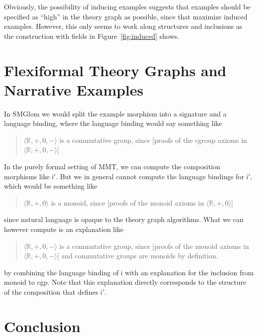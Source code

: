 \documentclass[11pt]{bluenote}
\begin{document}
Obviously, the possibility of inducing examples suggests that examples should be specified
as ``high'' in the theory graph as possible, since that maximize induced
examples. However, this only seems to work along structures and inclusions as the
construction with fields in Figure~\ref{fig:induced} shows.

\section{Flexiformal Theory Graphs and Narrative Examples}

In SMGlom we would split the example morphism into a signature and a language binding,
where the language binding would say something like 
\begin{quote}
  $\langle\mathbb{R},+,0,-\rangle$ is a commutative group, since [proofs of the cgroup
  axioms in $\langle\mathbb{R},+,0,-\rangle$]
\end{quote}
In the purely formal setting of MMT, we can compute the composition morphisms like
$\mathsf{i}'$. But we in general cannot compute the language bindings for $\mathsf{i}'$,
which would be something like 
\begin{quote}
  $\langle\mathbb{R},+,0\rangle$ is a monoid, since [proofs of the monoid axioms in $\langle\mathbb{R},+,0\rangle$]
\end{quote}
since natural language is opaque to the theory graph algorithms. What we can however
compute is an explanation like 
\begin{quote}
  $\langle\mathbb{R},+,0,-\rangle$ is a commutative group, since [proofs of the monoid
  axioms in $\langle\mathbb{R},+,0,-\rangle$] and commutative groups are monoids by
  definition.
\end{quote}
by combining the language binding of $\mathsf{i}$ with an explanation for the inclusion
from \textsf{monoid} to \textsf{cgp}. Note that this explanation directly corresponds to
the structure of the composition that defines $\mathsf{i}'$.

\section{Conclusion}
\end{document}

